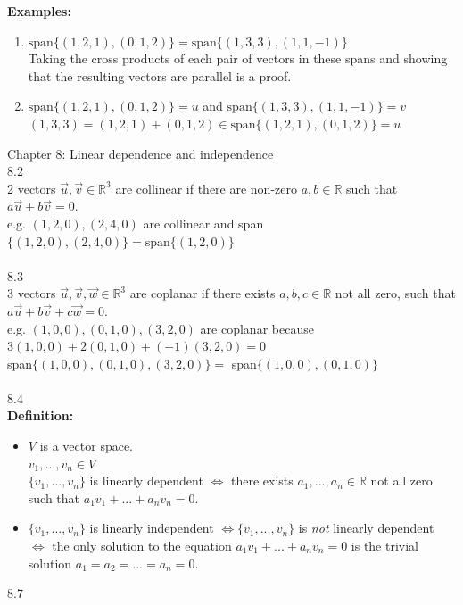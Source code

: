 \documentclass[]{article}
\begin{document}
		\normalsize
		{\bf Examples:}
		\begin{enumerate}
			\item $\text{span}\{ (1,2,1), (0,1,2) \}=\text{span}\{ (1,3,3), (1,1,-1) \}$\\
			Taking the cross products of each pair of vectors in these spans and showing that the resulting vectors are parallel is a proof.
			\item $\text{span}\{ (1,2,1), (0,1,2) \}=u$ and $\text{span}\{ (1,3,3), (1,1,-1) \}=v$\\
			$(1,3,3)=(1,2,1)+(0,1,2)\in\text{span}\{(1,2,1),(0,1,2)\}=u$\\
		\end{enumerate}
		\pagebreak
		\Large{Chapter 8: Linear dependence and independence}\\
		\large{8.2}\\
		\normalsize
		2 vectors $\vec{u},\vec{v}\in\mathbb{R}^3$ are collinear if there are non-zero $a,b\in\mathbb{R}$ such that $a\vec{u}+b\vec{v}=0$.\\
		e.g. $(1,2,0),(2,4,0)$ are collinear and span $\{ (1,2,0),(2,4,0) \}=\text{span}\{(1,2,0)\}$\\\\
		\large{8.3}\\
		\normalsize
		3 vectors $\vec{u},\vec{v},\vec{w}\in\mathbb{R}^3$ are coplanar if there exists $a,b,c\in\mathbb{R}$ not all zero, such that $a\vec{u}+b\vec{v}+c\vec{w}=0$.\\
		e.g. $(1,0,0),(0,1,0),(3,2,0)$ are coplanar because $3(1,0,0)+2(0,1,0)+(-1)(3,2,0)=0$\\
		span$\{ (1,0,0),(0,1,0),(3,2,0) \}=$ span$\{(1,0,0),(0,1,0)\}$\\\\
		\large{8.4}\\
		\normalsize
		{\bf Definition:}
		\begin{itemize}
			\item $V$ is a vector space.\\
			$v_1,...,v_n\in V$\\
			$\{v_1,...,v_n\}$ is linearly dependent $\iff$ there exists $a_1,...,a_n\in\mathbb{R}$ not all zero such that $a_1v_1+...+a_nv_n=0$.
			\item $\{ v_1,...,v_n \}$ is linearly independent $\iff\{v_1,...,v_n\}$ is \emph{not} linearly dependent $\iff$ the only solution to the equation $a_1v_1+...+a_nv_n=0$ is the trivial solution $a_1=a_2=...=a_n=0$.
		\end{itemize}
		\large{8.7}\\
\end{document}
